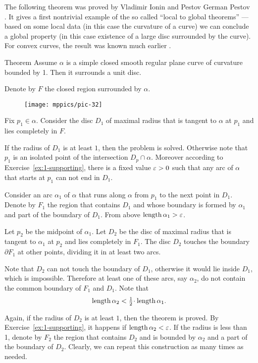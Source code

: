 The following theorem was proved by Vladimir Ionin and Pestov German Pestov \cite{pestov-ionin}.
It gives a first nontrivial example of the so called ``local to global theorems'' --- based on some local data (in this case the curvature of a curve) we can conclude a global property (in this case existence of a large disc surrounded by the curve).
For convex curves, the result was known much earlier \cite[\S 24]{blaschke}.

\begin{thm}{Theorem}\label{thm:moon}
Assume $\alpha$ is a simple closed smooth regular plane curve of curvature bounded by 1.
Then it surrounds a unit disc.
\end{thm}

Denote by $F$ the closed region surrounded by $\alpha$. 

\begin{figure}[h!]%
\vskip-0mm
\centering
\texttt{[image: mppics/pic-32]}
\vskip0mm
\end{figure}

Fix $p_1\in \alpha$.
Consider the disc $D_1$ of maximal radius 
that is tangent to $\alpha$ at $p_1$ and lies completely in $F$.

If the radius of $D_1$ is at least $1$, then the problem is solved.
Otherwise note that $p_1$ is an isolated point of the intersection $D_p\cap \alpha$.
Moreover according to Exercise~\ref{ex:1-supporting}, there is a fixed value $\varepsilon>0$ such that any arc of $\alpha$
that starts at $p_1$ can not end in $D_1$.


Consider an arc $\alpha_1$ of $\alpha$ that runs along $\alpha$ from $p_1$ to the next point in $D_1$.
Denote by $F_1$ the region that contains $D_1$ and whose boundary is formed by $\alpha_1$ and part of the boundary of $D_1$.
From above $\mathop{\rm length}\nolimits \alpha_1>\varepsilon$.

Let $p_2$ be the midpoint of $\alpha_1$.
Let $D_2$ be the disc of maximal radius that is tangent to $\alpha_1$ at $p_2$ and lies completely in $F_1$. 
The disc $D_2$ touches the boundary $\partial F_1$ at other points, dividing it in at least two arcs.

Note that $D_2$ can not touch the boundary of $D_1$, otherwise it would lie inside $D_1$, which is impossible.
Therefore at least one of these arcs, say $\alpha_2$, do not contain the common boundary of $F_1$ and $D_1$.
Note that 
\[\length \alpha_2< \tfrac12\cdot\length\alpha_1.\]

Again, if the radius of $D_2$ is at least $1$, then the theorem is proved.
By Exercise~\ref{ex:1-supporting}, it happens if $\mathop{\rm length}\nolimits \alpha_2<\varepsilon$.
If the radius is less than 1, denote by $F_2$ the region that contains $D_2$ and is bounded by $\alpha_2$ and a part of the boundary of $D_2$. Clearly, we can repeat this construction as many times as needed. 

